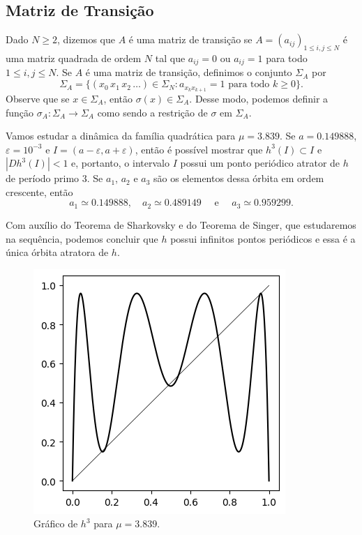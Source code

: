 \subsection{Matriz de Transição}

Dado $N \geq 2$, dizemos que $A$ é uma matriz de transição se $A = (a_{ij})_{1 \leq i,j \leq N}$ é uma matriz quadrada de ordem $N$ tal que $a_{ij} = 0$ ou $a_{ij} = 1$ para todo $1 \leq i,j \leq N$.
Se $A$ é uma matriz de transição, definimos o conjunto $\Sigma_A$ por
$$\Sigma_A = \lbrace (x_0 \, x_1 \, x_2 \, \dots) \in \Sigma_N : a_{x_k x_{k+1}} = 1 \text{ para todo } k \geq 0 \rbrace.$$
Observe que se $x \in \Sigma_A$, então $\sigma(x) \in \Sigma_A$.
Desse modo, podemos definir a função $\sigma_A: \Sigma_A \to \Sigma_A$ como sendo a restrição de $\sigma$ em $\Sigma_A$.

Vamos estudar a dinâmica da família quadrática para $\mu = 3.839$.
Se $a = 0.149888$, $\varepsilon = 10^{-3}$ e $I = (a - \varepsilon, a + \varepsilon)$, então é possível mostrar que $h^3(I) \subset I$ e $|D h^3(I)| < 1$ e, portanto, o intervalo $I$ possui um ponto periódico atrator de $h$ de período primo $3$. Se $a_1$, $a_2$ e $a_3$ são os elementos dessa órbita em ordem crescente, então
$$a_1 \simeq 0.149888, \quad a_2 \simeq 0.489149 \quad \text{ e } \quad a_3 \simeq 0.959299.$$

Com auxílio do Teorema de Sharkovsky e do Teorema de Singer, que estudaremos na sequência, podemos concluir que $h$ possui infinitos pontos periódicos e essa é a única órbita atratora de $h$.

\begin{figure}[!htb]
\centering
\includegraphics[scale=0.6]{images/h_3,839.png}
\caption{Gráfico de $h^3$ para $\mu = 3.839$.}
\label{h_3,839}
\end{figure}

